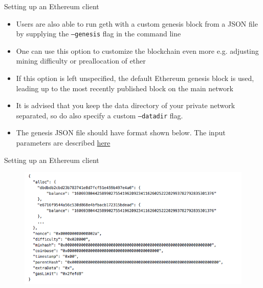 \documentclass[10pt]{beamer}
\begin{document}

\begin{frame}{Setting up an Ethereum client}
	\begin{itemize}
		\item Users are also able to run geth with a custom genesis block from a JSON file by supplying the \texttt{---genesis} flag in the command line
		\item  One can use this option to customize the blockchain even more e.g. adjusting mining difficulty or preallocation of ether
		\item If this option is left unspecified, the default Ethereum genesis block is used, leading up to the most recently published block on the main network
		\item It is advised that you keep the data directory of your private network separated, so do also specify a custom \texttt{---datadir} flag.
		\item The genesis JSON file should have format shown below. The input parameters are described \href{https://github.com/qobolwakhe/MSc2018/wiki/Genesis-Block}{here}
	\end{itemize}
\end{frame}


\begin{frame}{Setting up an Ethereum client}
		\begin{figure}[]
			\centering
			\includegraphics  [scale=0.4]{Images/geth2}
		\end{figure}
\end{frame}

\end{document}
